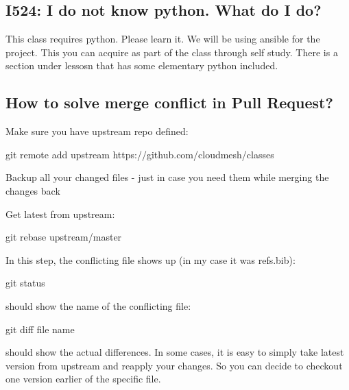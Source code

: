 \subsection{I524: I do not know python. What do I do?}
\label{\detokenize{faq:i524-i-do-not-know-python-what-do-i-do}}
This class requires python. Please learn it. We will be using ansible
for the project. This you can acquire as part of the class through
self study. There is a section under lessosn that has some elementary
python included.


\subsection{How to solve merge conflict in Pull Request?}
\label{\detokenize{faq:how-to-solve-merge-conflict-in-pull-request}}
Make sure you have upstream repo defined:

\begin{sphinxVerbatim}[commandchars=\\\{\}]
\PYGZdl{} git remote add upstream https://github.com/cloudmesh/classes
\end{sphinxVerbatim}

Backup all your changed files - just in case you need them while merging the changes back

Get latest from upstream:

\begin{sphinxVerbatim}[commandchars=\\\{\}]
\PYGZdl{} git rebase upstream/master
\end{sphinxVerbatim}

In this step, the conflicting file shows up (in my case it was refs.bib):

\begin{sphinxVerbatim}[commandchars=\\\{\}]
\PYGZdl{} git status
\end{sphinxVerbatim}

should show the name of the conflicting file:

\begin{sphinxVerbatim}[commandchars=\\\{\}]
\PYGZdl{} git diff \PYGZlt{}file name\PYGZgt{}
\end{sphinxVerbatim}

should show the actual differences. In some cases, it is easy to
simply take latest version from upstream and reapply your changes. So
you can decide to checkout one version earlier of the specific file.

